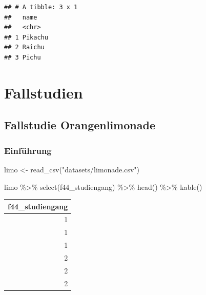 \documentclass[
]{book}
\newenvironment{Shaded}{\begin{snugshade}}{\end{snugshade}}
\newcommand{\FunctionTok}[1]{\textcolor[rgb]{0.00,0.00,0.00}{#1}}
\newcommand{\NormalTok}[1]{#1}
\newcommand{\OtherTok}[1]{\textcolor[rgb]{0.56,0.35,0.01}{#1}}
\newcommand{\SpecialCharTok}[1]{\textcolor[rgb]{0.00,0.00,0.00}{#1}}
\newcommand{\StringTok}[1]{\textcolor[rgb]{0.31,0.60,0.02}{#1}}
\begin{document}
\begin{verbatim}
## # A tibble: 3 x 1
##   name   
##   <chr>  
## 1 Pikachu
## 2 Raichu 
## 3 Pichu
\end{verbatim}

\hypertarget{part-fallstudien}{%
\part*{Fallstudien}\label{part-fallstudien}}

\hypertarget{fallstudie-orangenlimonade}{%
\chapter{Fallstudie Orangenlimonade}\label{fallstudie-orangenlimonade}}

\hypertarget{einfuxfchrung}{%
\section{Einführung}\label{einfuxfchrung}}

\begin{Shaded}
\begin{Highlighting}[]
\NormalTok{limo }\OtherTok{\textless{}{-}} \FunctionTok{read\_csv}\NormalTok{(}\StringTok{"datasets/limonade.csv"}\NormalTok{)}
\end{Highlighting}
\end{Shaded}

\begin{Shaded}
\begin{Highlighting}[]
\NormalTok{limo }\SpecialCharTok{\%\textgreater{}\%} 
  \FunctionTok{select}\NormalTok{(f44\_studiengang) }\SpecialCharTok{\%\textgreater{}\%} 
  \FunctionTok{head}\NormalTok{() }\SpecialCharTok{\%\textgreater{}\%} 
  \FunctionTok{kable}\NormalTok{()}
\end{Highlighting}
\end{Shaded}

\begin{tabular}{r}
\hline
f44\_studiengang\\
\hline
1\\
\hline
1\\
\hline
1\\
\hline
2\\
\hline
2\\
\hline
2\\
\hline
\end{tabular}
\end{document}
